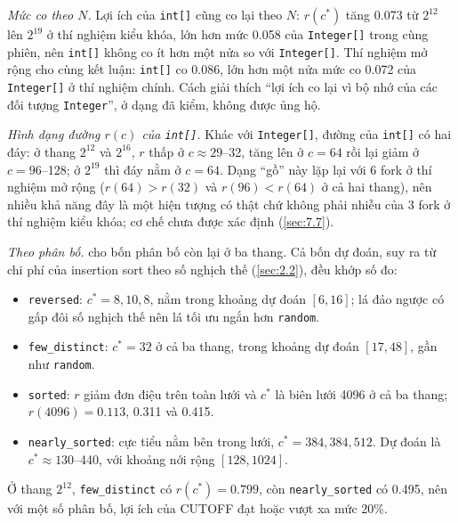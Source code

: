 \documentclass[12pt,a4paper]{article}
\begin{document}
\emph{Mức co theo $N$.} Lợi ích của \texttt{int[]} cũng co lại theo $N$: $r(c^*)$ tăng 0.073 từ $2^{12}$ lên $2^{19}$ ở thí nghiệm kiểu khóa, lớn hơn mức 0.058 của \texttt{Integer[]} trong cùng phiên, nên \texttt{int[]} không co ít hơn một nửa so với \texttt{Integer[]}. Thí nghiệm mở rộng cho cùng kết luận: \texttt{int[]} co 0.086, lớn hơn một nửa mức co 0.072 của \texttt{Integer[]} ở thí nghiệm chính. Cách giải thích ``lợi ích co lại vì bộ nhớ của các đối tượng \texttt{Integer}'', ở dạng đã kiểm, không được ủng hộ.

\emph{Hình dạng đường $r(c)$ của \texttt{int[]}.} Khác với \texttt{Integer[]}, đường của \texttt{int[]} có hai đáy: ở thang $2^{12}$ và $2^{16}$, $r$ thấp ở $c \approx 29$--32, tăng lên ở $c = 64$ rồi lại giảm ở $c = 96$--128; ở $2^{19}$ thì đáy nằm ở $c = 64$. Dạng ``gồ'' này lặp lại với 6 fork ở thí nghiệm mở rộng ($r(64) > r(32)$ và $r(96) < r(64)$ ở cả hai thang), nên nhiều khả năng đây là một hiện tượng có thật chứ không phải nhiễu của 3 fork ở thí nghiệm kiểu khóa; cơ chế chưa được xác định (\cref{sec:7.7}).

\emph{Theo phân bố.}  cho bốn phân bố còn lại ở ba thang. Cả bốn dự đoán, suy ra từ chi phí của insertion sort theo số nghịch thế (\cref{sec:2.2}), đều khớp số đo:
\begin{itemize}
\item \texttt{reversed}: $c^* = 8, 10, 8$, nằm trong khoảng dự đoán $[6, 16]$; lá đảo ngược có gấp đôi số nghịch thế nên lá tối ưu ngắn hơn \texttt{random}.
\item \texttt{few\_distinct}: $c^* = 32$ ở cả ba thang, trong khoảng dự đoán $[17, 48]$, gần như \texttt{random}.
\item \texttt{sorted}: $r$ giảm đơn điệu trên toàn lưới và $c^*$ là biên lưới 4096 ở cả ba thang; $r(4096) = 0.113$, 0.311 và 0.415.
\item \texttt{nearly\_sorted}: cực tiểu nằm bên trong lưới, $c^* = 384, 384, 512$. Dự đoán là $c^* \approx 130$--440, với khoảng nới rộng $[128, 1024]$.
\end{itemize}
Ở thang $2^{12}$, \texttt{few\_distinct} có $r(c^*) = 0.799$, còn \texttt{nearly\_sorted} có 0.495, nên với một số phân bố, lợi ích của CUTOFF đạt hoặc vượt xa mức 20\%.
\begin{table}[htbp]
\centering\footnotesize
\caption{Phân bố không ngẫu nhiên: $c^*$, $r(c^*)$ với CI hai tầng 95\%, vùng gần tối ưu và khoảng dự đoán.}\label{tab:other_dist}

\end{table}
\end{document}
